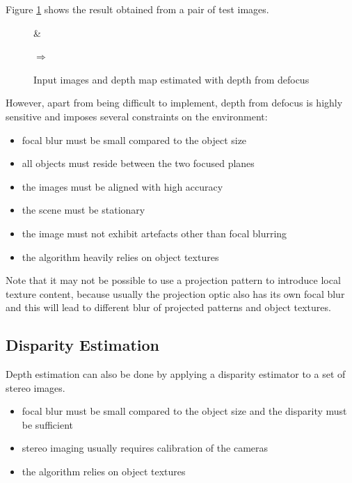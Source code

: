 \documentclass[a4paper,12pt]{book}
\begin{document}
Figure
\ref{fig:depthfromdefocus} shows the result obtained from a pair of
test images.
\begin{figure}
   \begin{center}
     \begin{minipage}[c]{.3\textwidth}
     \end{minipage}\&
     \begin{minipage}[c]{.3\textwidth}
     \end{minipage}$\Rightarrow$
     \begin{minipage}[c]{.3\textwidth}
     \end{minipage}
     \caption{Input images and depth map estimated with depth from
       defocus\label{fig:depthfromdefocus}}
   \end{center}
\end{figure}
However, apart from being difficult to implement, depth from defocus is highly
sensitive and imposes several constraints on the environment:
\begin{itemize}
\item focal blur must be small compared to the object size
\item all objects must reside between the two focused planes
\item the images must be aligned with high accuracy
\item the scene must be stationary
\item the image must not exhibit artefacts other than focal blurring
\item the algorithm heavily relies on object textures
\end{itemize}
Note that it may not be possible to use a projection pattern to introduce
local texture content, because usually the projection optic also has
its own focal blur and this will lead to different blur of projected patterns
and object textures.

\subsection{Disparity Estimation}
Depth estimation can also be done by applying a disparity estimator to
a set of stereo images. %
\begin{itemize}
\item focal blur must be small compared to the object size and the disparity
  must be sufficient
\item stereo imaging usually requires calibration of the cameras
\item the algorithm relies on object textures
\end{itemize}
\end{document}
